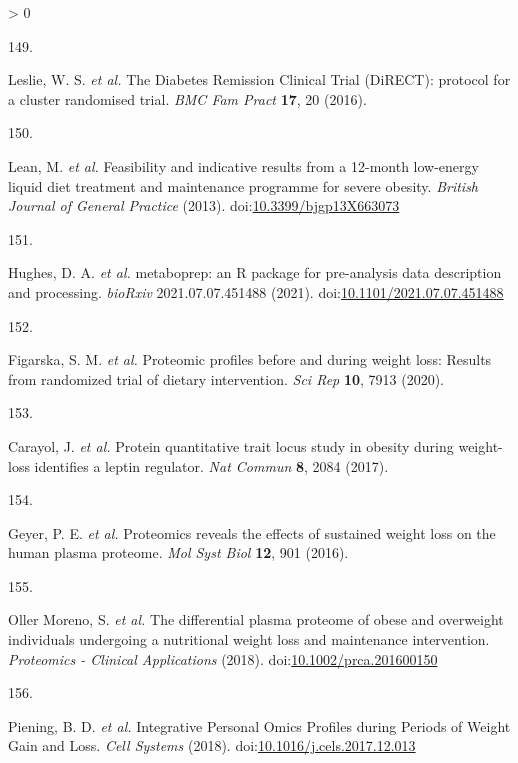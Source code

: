 \documentclass[11pt,twoside]{bristolthesis}
\newlength{\cslhangindent}
\newlength{\csllabelwidth}
\newenvironment{CSLReferences}[2] %
 {%
  \setlength{\parindent}{0pt}
  \ifodd #1 \everypar{\setlength{\hangindent}{\cslhangindent}}\ignorespaces\fi
  \ifnum #2 > 0
  \setlength{\parskip}{#2\baselineskip}
  \fi
 }%
 {}
\newcommand{\CSLLeftMargin}[1]{\parbox[t]{\csllabelwidth}{#1}}
\newcommand{\CSLRightInline}[1]{\parbox[t]{\linewidth - \csllabelwidth}{#1}\break}
\begin{document}
\begin{CSLReferences}{0}{0}
\leavevmode\hypertarget{ref-Leslie2016}{}%
\CSLLeftMargin{149. }
\CSLRightInline{Leslie, W. S. \emph{et al.} {The Diabetes Remission Clinical Trial (DiRECT): protocol for a cluster randomised trial}. \emph{BMC Fam Pract} \textbf{17}, 20 (2016).}

\leavevmode\hypertarget{ref-Lean2013}{}%
\CSLLeftMargin{150. }
\CSLRightInline{Lean, M. \emph{et al.} {Feasibility and indicative results from a 12-month low-energy liquid diet treatment and maintenance programme for severe obesity}. \emph{British Journal of General Practice} (2013). doi:\href{https://doi.org/10.3399/bjgp13X663073}{10.3399/bjgp13X663073}}

\leavevmode\hypertarget{ref-Hughes2021}{}%
\CSLLeftMargin{151. }
\CSLRightInline{Hughes, D. A. \emph{et al.} {metaboprep: an R package for pre-analysis data description and processing}. \emph{bioRxiv} 2021.07.07.451488 (2021). doi:\href{https://doi.org/10.1101/2021.07.07.451488}{10.1101/2021.07.07.451488}}

\leavevmode\hypertarget{ref-Figarska2020}{}%
\CSLLeftMargin{152. }
\CSLRightInline{Figarska, S. M. \emph{et al.} {Proteomic profiles before and during weight loss: Results from randomized trial of dietary intervention}. \emph{Sci Rep} \textbf{10}, 7913 (2020).}

\leavevmode\hypertarget{ref-Carayol2017}{}%
\CSLLeftMargin{153. }
\CSLRightInline{Carayol, J. \emph{et al.} {Protein quantitative trait locus study in obesity during weight-loss identifies a leptin regulator}. \emph{Nat Commun} \textbf{8}, 2084 (2017).}

\leavevmode\hypertarget{ref-Geyer2016}{}%
\CSLLeftMargin{154. }
\CSLRightInline{Geyer, P. E. \emph{et al.} {Proteomics reveals the effects of sustained weight loss on the human plasma proteome}. \emph{Mol Syst Biol} \textbf{12}, 901 (2016).}

\leavevmode\hypertarget{ref-OllerMoreno2018}{}%
\CSLLeftMargin{155. }
\CSLRightInline{Oller Moreno, S. \emph{et al.} {The differential plasma proteome of obese and overweight individuals undergoing a nutritional weight loss and maintenance intervention}. \emph{Proteomics - Clinical Applications} (2018). doi:\href{https://doi.org/10.1002/prca.201600150}{10.1002/prca.201600150}}

\leavevmode\hypertarget{ref-Piening2018}{}%
\CSLLeftMargin{156. }
\CSLRightInline{Piening, B. D. \emph{et al.} {Integrative Personal Omics Profiles during Periods of Weight Gain and Loss}. \emph{Cell Systems} (2018). doi:\href{https://doi.org/10.1016/j.cels.2017.12.013}{10.1016/j.cels.2017.12.013}}


\end{CSLReferences}
\end{document}
